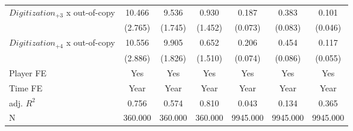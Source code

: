 {\begin{tabular*}{\hsize}{@{\hskip\tabcolsep\extracolsep\fill}l*{6}{c}}
\addlinespace
$Digitization_{+3}$ x out-of-copy&      10.466         &       9.536         &       0.930         &       0.187         &       0.383         &       0.101         \\
            &     (2.765)\sym{***}&     (1.745)\sym{***}&     (1.452)         &     (0.073)\sym{**} &     (0.083)\sym{***}&     (0.046)\sym{**} \\
\addlinespace
$Digitization_{+4}$ x out-of-copy&      10.556         &       9.905         &       0.652         &       0.206         &       0.454         &       0.117         \\
            &     (2.886)\sym{***}&     (1.826)\sym{***}&     (1.510)         &     (0.074)\sym{***}&     (0.086)\sym{***}&     (0.055)\sym{**} \\
\midrule
Player FE   &         Yes         &         Yes         &         Yes         &         Yes         &         Yes         &         Yes         \\
Time FE     &        Year         &        Year         &        Year         &        Year         &        Year         &        Year         \\
adj. $R^2$  &       0.756         &       0.574         &       0.810         &       0.043         &       0.134         &       0.365         \\
N           &     360.000         &     360.000         &     360.000         &    9945.000         &    9945.000         &    9945.000         \\
\bottomrule
\end{tabular*}
}

